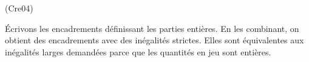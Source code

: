 \begin{tiny}(Cre04)\end{tiny} \'Ecrivons les encadrements définissant les parties entières. En les combinant, on obtient des encadrements avec des inégalités strictes. Elles sont équivalentes aux inégalités larges demandées parce que les quantités en jeu sont entières.

